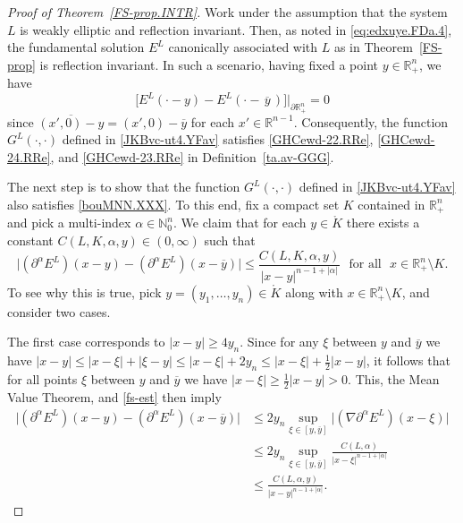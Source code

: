 \documentclass[11pt,reqno]{amsart}
\numberwithin{equation}{section}
\theoremstyle{remark}
\begin{document}
\vskip 0.08in
\begin{proof}[Proof of Theorem~\ref{FS-prop.INTR}]
Work under the assumption that the system $L$ is weakly elliptic and reflection invariant.
Then, as noted in \eqref{eq:edxuye.FDa.4}, the fundamental solution $E^L$ canonically associated with $L$ as in 
Theorem~\ref{FS-prop} is reflection invariant. In such a scenario, having fixed a point $y\in{\mathbb{R}}^n_{+}$, we have
%
\begin{equation}\label{JKBk-at5G.Faf}
\big[E^L(\cdot-y)-E^L(\cdot-\,\overline{y}\,)\big]\big|_{\partial{\mathbb{R}}^n_{+}}=0
\end{equation}
%
since $\overline{(x',0)-y}=(x',0)-\overline{y}$ for each $x'\in{\mathbb{R}}^{n-1}$. Consequently, the function 
$G^L(\cdot,\cdot)$ defined in \eqref{JKBvc-ut4.YFav} satisfies \eqref{GHCewd-22.RRe}, \eqref{GHCewd-24.RRe}, and \eqref{GHCewd-23.RRe} 
in Definition~\ref{ta.av-GGG}.

The next step is to show that the function $G^L(\cdot,\cdot)$ defined in \eqref{JKBvc-ut4.YFav} also satisfies 
\eqref{bouMNN.XXX}. To this end, fix a compact set $K$ contained in ${\mathbb{R}}^n_{+}$ and pick a multi-index 
$\alpha\in\mathbb{N}_0^n$. We claim that for each $y\in\mathring{K}$ there exists a constant $C(L,K,\alpha,y)\in(0,\infty)$ 
such that 
%
\begin{equation}\label{jdhdfasg}
\big|(\partial^\alpha E^L)(x-y)-(\partial^\alpha E^L)(x-\overline{y})\big|
\leq\frac{C(L,K,\alpha,y)}{|x-y|^{n-1+|\alpha|}}\,\,\text{ for all }\,\,x\in{\mathbb{R}}^n_{+}\setminus K.
\end{equation}
%
To see why this is true, pick $y=(y_1,\dots,y_n)\in\mathring{K}$ along with $x\in{\mathbb{R}}^n_{+}\setminus K$, and consider two cases. 

The first case corresponds to $|x-y|\geq 4y_n$. Since for any $\xi$ between $y$ and $\overline{y}$ we have 
$|x-y|\leq |x-\xi|+|\xi-y|\leq |x-\xi|+2y_n\leq |x-\xi|+\frac{1}{2}|x-y|$, it follows that for all points $\xi$ between 
$y$ and $\overline{y}$ we have $|x-\xi|\geq\frac{1}{2}|x-y|>0$. This, the Mean Value Theorem, and \eqref{fs-est} then imply
%
\begin{align}\label{ABB-lm-jL.1}
\big|(\partial^\alpha E^L)(x-y)-(\partial^\alpha E^L)(x-\overline{y})\big|
&\leq 2y_n\sup_{\xi\in[y,\overline{y}]}\big|(\nabla\partial^\alpha E^L)(x-\xi)\big|
\nonumber\\[4pt]
&\leq 2y_n\sup_{\xi\in[y,\overline{y}]}\frac{C(L,\alpha)}{|x-\xi|^{n-1+|\alpha|}}
\nonumber\\[4pt]
&\leq\frac{C(L,\alpha,y)}{|x-y|^{n-1+|\alpha|}}.
\end{align}


\end{proof}
\end{document}
